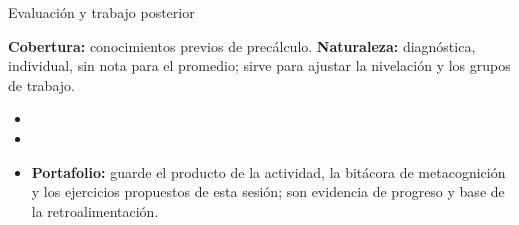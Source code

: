 \documentclass[10pt,aspectratio=169]{beamer}
\begin{document}
\begin{frame}{Evaluación y trabajo posterior}
  \small
  \begin{evalbox}
    \textbf{Cobertura:} conocimientos previos de precálculo. \textbf{Naturaleza:} diagnóstica, individual, sin nota para el promedio; sirve para ajustar la nivelación y los grupos de trabajo.
  \end{evalbox}
  \begin{itemize}
    \item \criterios
    \item \declaracionia
    \item \textbf{Portafolio:} guarde el producto de la actividad, la bitácora de metacognición y los ejercicios propuestos de esta sesión; son evidencia de progreso y base de la retroalimentación.
  \end{itemize}
\end{frame}
\end{document}
